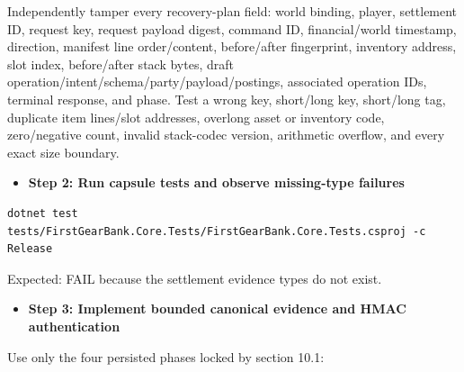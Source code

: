 \documentclass[
  10pt,
  letterpaper,
]{article}
\providecommand{\tightlist}{%
  \setlength{\itemsep}{0pt}\setlength{\parskip}{0pt}}
\begin{document}
Independently tamper every recovery-plan field: world binding, player,
settlement ID, request key, request payload digest, command ID,
financial/world timestamp, direction, manifest line order/content,
before/after fingerprint, inventory address, slot index, before/after
stack bytes, draft
operation/\allowbreak{}intent/\allowbreak{}schema/\allowbreak{}party/\allowbreak{}payload/\allowbreak{}postings,
associated operation IDs, terminal response, and phase. Test a wrong
key, short/long key, short/long tag, duplicate item lines/slot
addresses, overlong asset or inventory code, zero/negative count,
invalid stack-codec version, arithmetic overflow, and every exact size
boundary.

\begin{itemize}
\tightlist
\item[$\square$]
  \textbf{Step 2: Run capsule tests and observe missing-type failures}
\end{itemize}

\begin{lstlisting}
dotnet test tests/FirstGearBank.Core.Tests/FirstGearBank.Core.Tests.csproj -c Release
\end{lstlisting}

Expected: FAIL because the settlement evidence types do not exist.

\begin{itemize}
\tightlist
\item[$\square$]
  \textbf{Step 3: Implement bounded canonical evidence and HMAC
  authentication}
\end{itemize}

Use only the four persisted phases locked by section 10.1:
\end{document}
